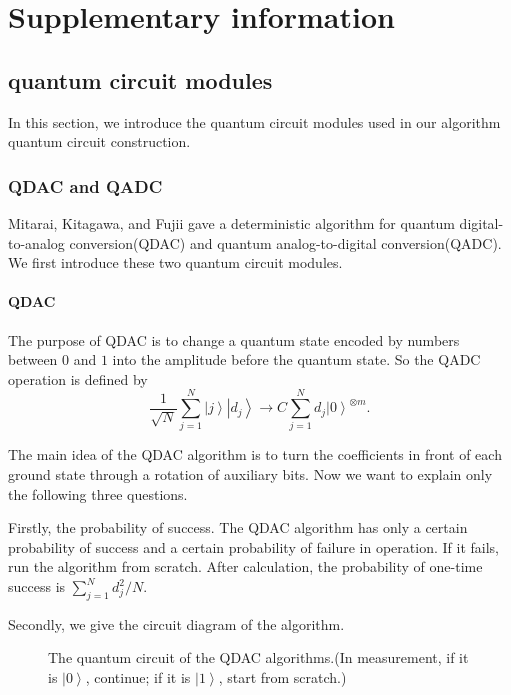 \documentclass[%
 reprint,
 amsmath,amssymb,
pra,
]{revtex4-1}
\begin{document}
\clearpage

\section{Supplementary information}
\subsection{quantum circuit modules}
In this section, we introduce the quantum circuit modules used in our algorithm quantum circuit construction.


\subsubsection{QDAC and QADC}
Mitarai, Kitagawa, and Fujii \cite{mitarai2019quantum} gave a deterministic algorithm for quantum digital-to-analog conversion(QDAC) and quantum analog-to-digital conversion(QADC). We first introduce these two quantum circuit modules.
\paragraph{QDAC}

The purpose of QDAC is to change a quantum state encoded by numbers between $0$ and $1$ into the amplitude before the quantum state. So the QADC operation is defined by
\[\frac{1}{{\sqrt N }}\sum\limits_{j = 1}^N {\left| j \right\rangle \left| {{d_j}} \right\rangle  \to C\sum\limits_{j = 1}^N {{d_j}{{\left| 0 \right\rangle }^{ \otimes m}}} }. \]

The main idea of the QDAC algorithm is to turn the coefficients in front of each ground state through a rotation of auxiliary bits. Now we want to explain only the following three questions.

Firstly, the probability of success. The QDAC algorithm has only a certain probability of success and a certain probability of failure in operation. If it fails, run the algorithm from scratch. After calculation, the probability of one-time success is $\sum\nolimits_{j = 1}^N {d_j^2/N} $\cite{mitarai2019quantum}.

Secondly, we give the circuit diagram of the algorithm.

\begin{figure}[htbp]
  \caption{The quantum circuit of the QDAC algorithms.(In measurement, if it is $\left| 0 \right\rangle $, continue; if it is $\left| 1 \right\rangle $, start from scratch.)}
 \label{QDAC_qcir}
\end{figure}
\end{document}
